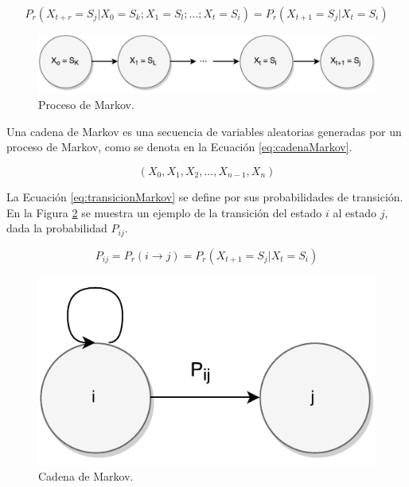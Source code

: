 \begin{equation} \label{eq:defMarkov} 
	P_r(X_{t+r} = S_j | X_0 = S_k ; X_1 = S_l ; ... ; X_t = S_i) = P_r(X_{t+1} = S_j | X_t = S_i)
\end{equation}

\begin{figure}[ht!]
  \centering
    \includegraphics[scale=0.6]{images/ProcesoMarkov.pdf}
  \caption{Proceso de Markov.}
  \label{fig:procesoMarkov}
\end{figure}

Una cadena de Markov es una secuencia de variables aleatorias generadas por un proceso de Markov, como se denota en la Ecuación \ref{eq:cadenaMarkov}.

\begin{equation} \label{eq:cadenaMarkov}
	(X_0, X_1, X_2, ..., X_{n-1}, X_{n})
\end{equation}

La Ecuación \ref{eq:transicionMarkov} se define por sus probabilidades de transición. En la Figura \ref{fig:cadenaMarkov} se muestra un ejemplo de la transición del estado $i$ al estado $j$, dada la probabilidad $P_{ij}$.

\begin{equation} \label{eq:transicionMarkov}
	P_{ij} = P_r(i \rightarrow j) = P_r(X_{t+1} = S_j | X_t = S_i)
\end{equation}

\begin{figure}[ht!]
  \centering
    \includegraphics[scale=0.6]{images/CadenaMarkov.pdf}
  \caption{Cadena de Markov.}
  \label{fig:cadenaMarkov}
\end{figure}


